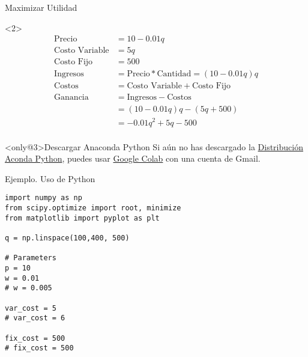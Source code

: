 \begin{frameExample}{Maximizar Utilidad}{}

  \begin{onlyenv}<2>
    \begin{align*}
    \text{Precio} & = 10 - 0.01q\\
    \text{Costo Variable} & = 5q \\
    \text{Costo Fijo} & = 500\\[3mm]
    \text{Ingresos} & = \text{Precio} * \text{Cantidad} = (10 - 0.01q)q\\
    \text{Costos} &= \text{Costo Variable} + \text{Costo Fijo}\\[5mm]
      \text{Ganancia} &=  \text{Ingresos} - \text{Costos}\\
                  & = (10 - 0.01q)q - (5q + 500)\\
      & = -0.01q^2 + 5q - 500\\
  \end{align*}
  \end{onlyenv}

  \begin{alertblock}<only@3>{Descargar Anaconda Python} \justifying
      Si aún no has descargado la \href{https://www.anaconda.com/products/individual}{Distribución Aconda Python}, puedes usar \href{https://colab.research.google.com/notebooks/intro.ipynb}{Google Colab} con una cuenta de Gmail.
    \end{alertblock}
    
\end{frameExample}


\begin{frame}[fragile]{Ejemplo. Uso de Python}

  
  \begin{lstlisting}
import numpy as np
from scipy.optimize import root, minimize
from matplotlib import pyplot as plt

q = np.linspace(100,400, 500)

# Parameters
p = 10
w = 0.01
# w = 0.005

var_cost = 5
# var_cost = 6

fix_cost = 500
# fix_cost = 500

  \end{lstlisting}
\end{frame}

